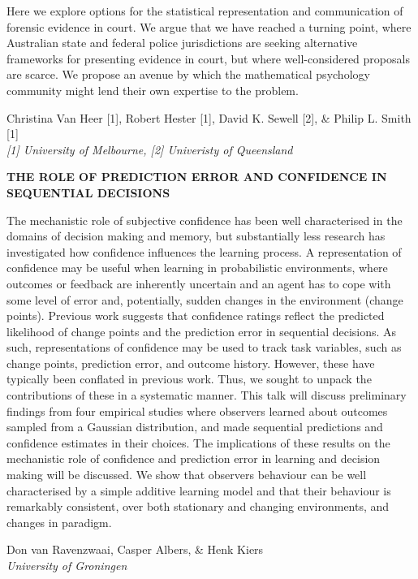 \documentclass[]{article}
\begin{document}
Here we explore options for the statistical representation and
communication of forensic evidence in court. We argue that we have
reached a turning point, where Australian state and federal police
jurisdictions are seeking alternative frameworks for presenting evidence
in court, but where well-considered proposals are scarce. We propose an
avenue by which the mathematical psychology community might lend their
own expertise to the problem.\\
\pagebreak  

Christina Van Heer {[}1{]}, Robert Hester {[}1{]}, David K. Sewell
{[}2{]}, \& Philip L. Smith {[}1{]}\\
\emph{{[}1{]} University of Melbourne, {[}2{]} Univeristy of Queensland}

\textbf{THE ROLE OF PREDICTION ERROR AND CONFIDENCE IN SEQUENTIAL
DECISIONS }

The mechanistic role of subjective confidence has been well
characterised in the domains of decision making and memory, but
substantially less research has investigated how confidence influences
the learning process. A representation of confidence may be useful when
learning in probabilistic environments, where outcomes or feedback are
inherently uncertain and an agent has to cope with some level of error
and, potentially, sudden changes in the environment (change points).
Previous work suggests that confidence ratings reflect the predicted
likelihood of change points and the prediction error in sequential
decisions. As such, representations of confidence may be used to track
task variables, such as change points, prediction error, and outcome
history. However, these have typically been conflated in previous work.
Thus, we sought to unpack the contributions of these in a systematic
manner. This talk will discuss preliminary findings from four empirical
studies where observers learned about outcomes sampled from a Gaussian
distribution, and made sequential predictions and confidence estimates
in their choices. The implications of these results on the mechanistic
role of confidence and prediction error in learning and decision making
will be discussed. We show that observers behaviour can be well
characterised by a simple additive learning model and that their
behaviour is remarkably consistent, over both stationary and changing
environments, and changes in paradigm.\\
\pagebreak  

Don van Ravenzwaai, Casper Albers, \& Henk Kiers\\
\emph{University of Groningen }
\end{document}
